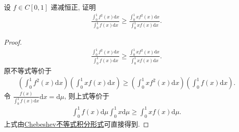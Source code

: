 \documentclass[../../main.tex]{subfiles}%
\begin{document}
\begin{example}
设 $f \in C[0,1]$ 递减恒正, 证明
\begin{align*}
\frac{\int_0^1 f^2(x)\mathrm{d}x}{\int_0^1 f(x)\mathrm{d}x} \geqslant \frac{\int_0^1 xf^2(x)\mathrm{d}x}{\int_0^1 xf(x)\mathrm{d}x}.
\end{align*}
\end{example}
\begin{proof}
\begin{align*}
\frac{\int_0^1 f^2(x)\mathrm{d}x}{\int_0^1 f(x)\mathrm{d}x} \geqslant \frac{\int_0^1 xf^2(x)\mathrm{d}x}{\int_0^1 xf(x)\mathrm{d}x}.
\end{align*}
原不等式等价于
\begin{align*}
\left(\int_0^1 f^2(x)\mathrm{d}x\right)\left(\int_0^1 xf(x)\mathrm{d}x\right) \geqslant \left(\int_0^1 xf^2(x)\mathrm{d}x\right)\left(\int_0^1 f(x)\mathrm{d}x\right).
\end{align*}
令 $\frac{f(x)}{\int_0^1 f(x)\mathrm{d}x}\mathrm{d}x = \mathrm{d}\mu$, 则上式等价于
\begin{align*}
\int_0^1 f(x)\mathrm{d}\mu \int_0^1 x\mathrm{d}\mu \geqslant \int_0^1 xf(x)\mathrm{d}\mu.
\end{align*}
上式由\hyperref[Chebeshev不等式积分形式]{Chebeshev不等式积分形式}可直接得到. 
\end{proof}
\end{document}
